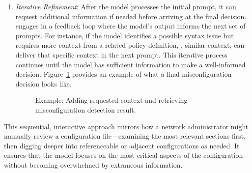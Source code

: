 \begin{enumerate}
    \item \textit{Iterative Refinement}: After the model processes the initial prompt, it can request additional information if needed before arriving at the final decision. \sysname{} engages in a feedback loop where the model’s output informs the next set of prompts. For instance, if the model identifies a possible syntax issue but requires more context from a related policy definition, \ie, similar context, \sysname{} can deliver that specific context in the next prompt. This iterative process continues until the model has sufficient information to make a well-informed decision. Figure~\ref{fig:feedback_and_response} provides an example of what a final misconfiguration decision looks like.
    \begin{figure}[t]
    \centering
    \caption{Example: Adding requested context and retrieving misconfiguration detection result.}
    \label{fig:feedback_and_response}
\end{figure}

\end{enumerate}

This sequential, interactive approach mirrors how a network administrator might manually review a configuration file—examining the most relevant sections first, then digging deeper into referenceable or adjacent configurations as needed. It ensures that the model focuses on the most critical aspects of the configuration without becoming overwhelmed by extraneous information.

